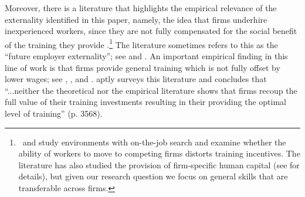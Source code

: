 \documentclass[12pt]{article} %
\theoremstyle{definition}
\begin{document}
Moreover, there is a literature that highlights the empirical relevance of the externality identified in this paper, namely, the idea that firms underhire inexperienced workers, since they are not fully compensated for the social benefit of the training they provide \citep{becker2009human, acemoglu1997training, acemoglu1999beyond}.\footnote{\,\cite{moen2004does} and \cite{lentz2024training} study environments with on-the-job search and examine whether the ability of workers to move to competing firms distorts training incentives. 
The literature has also studied the provision of firm-specific human capital (see \citealt{lentz2024training} for details), but given our research question we focus on general skills that are transferable across firms.}
The literature sometimes refers to this as the ``future employer externality''; see \cite{acemoglu1997training} and \cite{lentz2024training}.
An important empirical finding in this line of work is that firms provide general training which is not fully offset by lower wages; see \cite{acemoglu1998firms}, \cite{loewenstein1998dividing}, and \cite{autor2001temporary}.
\cite{pallais2014inefficient} aptly surveys this literature and concludes that ``...neither the theoretical nor the empirical literature shows that firms recoup the full value of their training investments resulting in their providing the optimal level of training'' (p. 3568).

\end{document}
